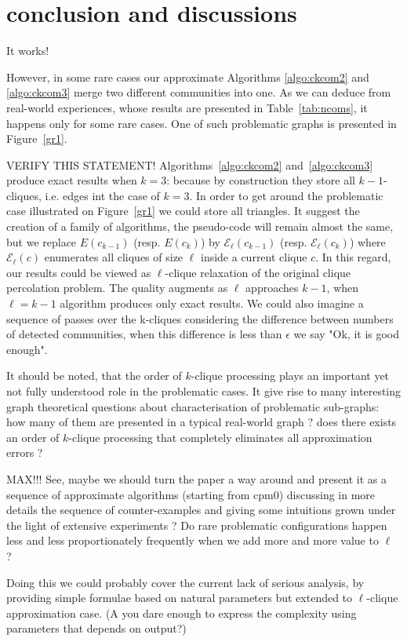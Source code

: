 \documentclass[a4paper,12pt]{article}
\begin{document}
\section{conclusion and discussions}

It works!

However, in some rare cases our approximate Algorithms \ref{algo:ckcom2} and
\ref{algo:ckcom3} merge two different communities into one. 
As we can deduce from real-world experiences,
whose results are presented in Table~\ref{tab:ncoms}, 
it happens only for some rare cases. 
One of such problematic graphs is presented in
Figure~\ref{gr1}. 

{\color{red} VERIFY THIS STATEMENT!}
Algorithms~\ref{algo:ckcom2} and~\ref{algo:ckcom3} 
produce exact results when $k = 3$: because by construction 
they store all $k-1$-cliques, i.e. edges int the case of 
$k=3$.
In order to get around the problematic case illustrated 
on Figure~\ref{gr1}
we could store all triangles. It suggest the creation
of a family of algorithms, the pseudo-code will remain almost
the same, but we replace $E(c_{k-1})$ 
(resp. $E(c_k)$)
by $\mathcal{E}_\ell(c_{k-1})$ (resp. $\mathcal{E}_\ell(c_k)$)
where $\mathcal{E}_\ell(c)$ enumerates all cliques of
size $\ell$ inside a current clique $c$. 
In this regard, our results could be viewed 
as $\ell$-clique relaxation of the original 
clique percolation problem. The quality augments as $\ell$
approaches $k-1$, when $\ell = k-1$ algorithm produces only 
exact results. We could also imagine a sequence of 
passes over the k-cliques considering the difference between 
numbers of detected communities, when this difference is less than $\epsilon$ we say "Ok, it is good enough".

It should be noted, that the order of $k$-clique
processing plays an important yet not fully understood
role in the problematic cases.
It give rise to many interesting
graph theoretical questions about
characterisation of problematic sub-graphs:
how many of them are presented in a typical real-world graph ?
does there exists an order of $k$-clique processing that
completely eliminates all approximation errors ?


{\color{red} 
MAX!!! See, maybe we should turn the paper a way around
and present it as a sequence of approximate algorithms (starting from cpm0) discussing
in more details the sequence of counter-examples and giving some intuitions grown under the light of extensive experiments ? 
Do rare problematic configurations happen
less and less proportionately frequently
when we add more and more value to $\ell$
? 


Doing this we could probably cover
the current lack of serious analysis,
by providing simple formulae based on natural parameters
but extended to $\ell$-clique approximation case.
(A you dare enough to express the complexity using 
parameters that depends on output?)
}
\end{document}
